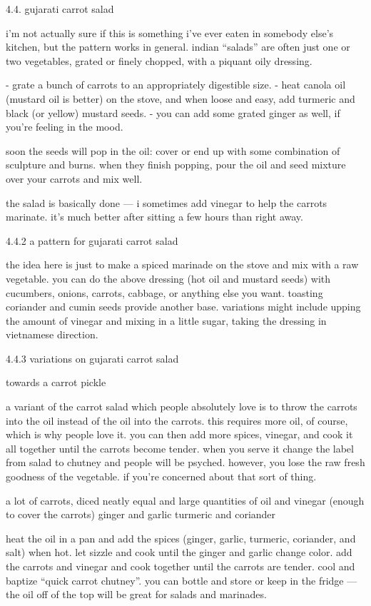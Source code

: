 4.4.  gujarati carrot salad

i'm not actually sure if this is something i've ever eaten in somebody else's kitchen, but the pattern works in general. indian ``salads'' are often just one or two vegetables, grated or finely chopped, with a piquant oily dressing.

-	grate a bunch of carrots to an appropriately digestible size.
-	heat canola oil (mustard oil is better) on the stove, and when loose and easy, add turmeric and black (or yellow) mustard seeds.
-	you can add some grated ginger as well, if you're feeling in the mood.

soon the seeds will pop in the oil: cover or end up with some combination of sculpture and burns. when they finish popping, pour the oil and seed mixture over your carrots and mix well.

the salad is basically done --- i sometimes add vinegar to help the carrots marinate. it's much better after sitting a few hours than right away.


4.4.2  a pattern for gujarati carrot salad

the idea here is just to make a spiced marinade on the stove and mix with a raw vegetable. you can do the above dressing (hot oil and mustard seeds) with cucumbers, onions, carrots, cabbage, or anything else you want. toasting coriander and cumin seeds provide another base. variations might include upping the amount of vinegar and mixing in a little sugar, taking the dressing in vietnamese direction.


4.4.3 variations on gujarati carrot salad

towards a carrot pickle

a variant of the carrot salad which people absolutely love is to throw the carrots into the oil instead of the oil into the carrots. this requires more oil, of course, which is why people love it. you can then add more spices, vinegar, and cook it all together until the carrots become tender. when you serve it change the label from salad to chutney and people will be psyched. however, you lose the raw fresh goodness of the vegetable. if you're concerned about that sort of thing.

a lot of carrots, diced neatly
equal and large quantities of oil and vinegar (enough to cover the carrots)
ginger and garlic
turmeric and coriander

heat the oil in a pan and add the spices (ginger, garlic, turmeric, coriander, and salt) when hot. let sizzle and cook until the ginger and garlic change color. add the carrots and vinegar and cook together until the carrots are tender. cool and baptize ``quick carrot chutney''. you can bottle and store or keep in the fridge --- the oil off of the top will be great for salads and marinades.

